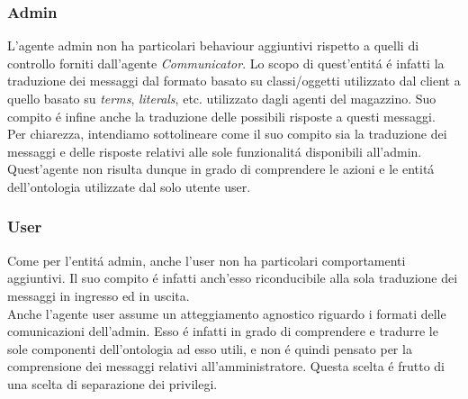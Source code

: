 \subsubsection{Admin}
L'agente admin non ha particolari behaviour aggiuntivi rispetto a quelli di controllo forniti dall'agente \textit{Communicator}. Lo scopo di quest'entit\'a \'e infatti la traduzione dei messaggi dal formato basato su classi/oggetti utilizzato dal client a quello basato su \textit{terms}, \textit{literals}, etc. utilizzato dagli agenti del magazzino. Suo compito \'e infine anche la traduzione delle possibili risposte a questi messaggi.\\%
Per chiarezza, intendiamo sottolineare come il suo compito sia la traduzione dei messaggi e delle risposte relativi alle sole funzionalit\'a disponibili all'admin. Quest'agente non risulta dunque in grado di comprendere le azioni e le entit\'a dell'ontologia utilizzate dal solo utente user.

\subsubsection{User}
Come per l'entit\'a admin, anche l'user non ha particolari comportamenti aggiuntivi. Il suo compito \'e infatti anch'esso riconducibile alla sola traduzione dei messaggi in ingresso ed in uscita.\\
Anche l'agente user assume un atteggiamento agnostico riguardo i formati delle comunicazioni dell'admin. Esso \'e infatti in grado di comprendere e tradurre le sole componenti dell'ontologia ad esso utili, e non \'e quindi pensato per la comprensione dei messaggi relativi all'amministratore. Questa scelta \'e frutto di una scelta di separazione dei privilegi.

